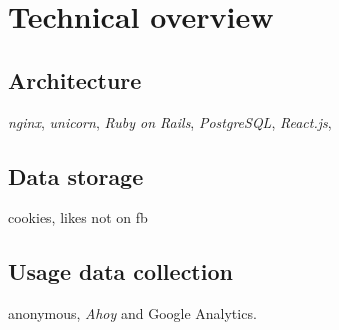 
\chapter{Technical overview}

\section{Architecture}

\emph{nginx}, \emph{unicorn}, \emph{Ruby on Rails}, \emph{PostgreSQL}, \emph{React.js}, 

\section{Data storage}

cookies, likes not on fb

\section{Usage data collection}

anonymous, \emph{Ahoy} and Google Analytics.